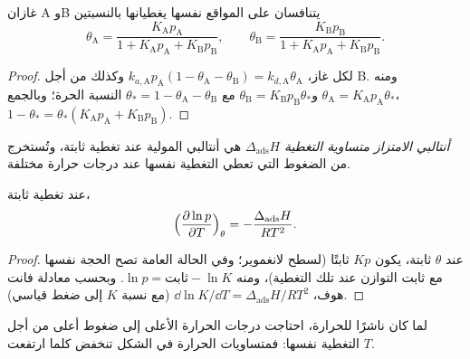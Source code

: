 \begin{proposition}\label{prop:b3:surfaces-catalysis:competitive}
غازان A وB يتنافسان على المواقع نفسها يغطيانها بالنسبتين
\[
  \theta_{\mathrm A} = \frac{K_{\mathrm A}p_{\mathrm A}}{1 + K_{\mathrm A}p_{\mathrm A} + K_{\mathrm B}p_{\mathrm B}}, \qquad
  \theta_{\mathrm B} = \frac{K_{\mathrm B}p_{\mathrm B}}{1 + K_{\mathrm A}p_{\mathrm A} + K_{\mathrm B}p_{\mathrm B}} .
\]
\end{proposition}

\begin{proof}
لكل غاز، $k_{a,\mathrm A}p_{\mathrm A}(1 - \theta_{\mathrm A} - \theta_{\mathrm B}) = k_{d,\mathrm A}\theta_{\mathrm A}$ وكذلك من أجل B. ومنه
$\theta_{\mathrm A} = K_{\mathrm A}p_{\mathrm A}\theta_\ast$ و$\theta_{\mathrm B} = K_{\mathrm B}p_{\mathrm B}\theta_\ast$ مع $\theta_\ast = 1 - \theta_{\mathrm A} - \theta_{\mathrm B}$ النسبة الحرة؛ وبالجمع،
$1 - \theta_\ast = \theta_\ast(K_{\mathrm A}p_{\mathrm A} + K_{\mathrm B}p_{\mathrm B})$.
\end{proof}

\begin{definition}\label{def:b3:surfaces-catalysis:isosteric}
\emph{أنتالبي الامتزاز متساوية التغطية}
$\Delta_{\mathrm{ads}}H$ هي أنتالبي  المولية عند تغطية ثابتة،
وتُستخرج من الضغوط التي تعطي التغطية نفسها عند درجات حرارة
مختلفة.
\end{definition}

\begin{proposition}\label{prop:b3:surfaces-catalysis:isosteric}
عند تغطية ثابتة،
\[
  \Bigl(\frac{\partial\ln p}{\partial T}\Bigr)_\theta = -\frac{\Delta_{\mathrm{ads}}H}{RT^2} .
\]
\end{proposition}

\begin{proof}
عند $\theta$ ثابتة، يكون $Kp$ ثابتًا (لسطح لانغموير؛ وفي الحالة العامة تصح الحجة
نفسها مع ثابت التوازن عند تلك التغطية)، ومنه $\ln p =
\text{ثابت} - \ln K$. وبحسب معادلة فانت هوف، $\dd\ln K/\dd T = \Delta_{\mathrm{ads}}H/RT^2$ (مع نسبة $K$
إلى ضغط قياسي).
\end{proof}

لما كان  ناشرًا للحرارة، احتاجت درجات الحرارة الأعلى إلى ضغوط أعلى من أجل
التغطية نفسها: فمتساويات الحرارة في الشكل تنخفض كلما ارتفعت $T$.

